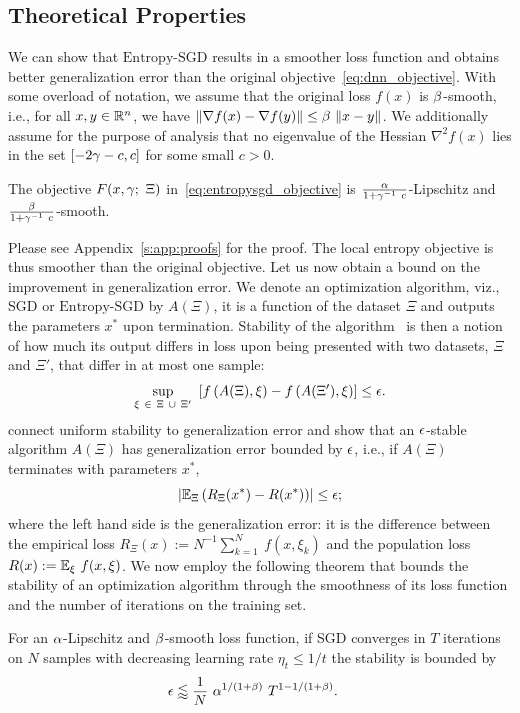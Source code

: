 \documentclass[10pt]{article}
\newcommand{\entropysgd}{\mathrm{Entropy}\textrm{-}\mathrm{SGD}}
\begin{document}
\subsection{Theoretical Properties}
\label{ss:theoretical_properties}

We can show that $\entropysgd$ results in a smoother loss function and obtains better generalization error than the original objective~\eqref{eq:dnn_objective}. With some overload of notation, we assume that the original loss $f(x)$ is $\beta$-smooth, i.e., for all $x,y \in \mathbb{R}^n$, we have $\lVert\nabla f(x) - \nabla f(y)\rVert \leq \beta\ \lVert x-y\rVert$. We additionally assume for the purpose of analysis that no eigenvalue of the Hessian $\nabla^2 f(x)$ lies in the set $[-2 \gamma-c, c]$ for some small $c > 0$.
%
\begin{lemma}
\label{lem:smoothness_reduction}
The objective $F(x, \gamma;\ \Xi)$ in~\eqref{eq:entropysgd_objective} is $\frac{\alpha}{1 + \gamma^{-1}\ c}$-Lipschitz and $\frac{\beta}{1 + \gamma^{-1}\ c}$-smooth.
\end{lemma}
Please see Appendix~\ref{s:app:proofs} for the proof. The local entropy objective is thus smoother than the original objective.
%
Let us now obtain a bound on the improvement in generalization error. We denote an optimization algorithm, viz., SGD or $\entropysgd$ by $A(\Xi)$, it is a function of the dataset $\Xi$ and outputs the parameters $x^*$ upon termination. Stability of the algorithm~\citep{bousquet2002stability} is then a notion of how much its output differs in loss upon being presented with two datasets, $\Xi$ and $\Xi'$, that differ in at most one sample:
$$
    \sup_{\xi\ \in\ \Xi\ \cup\ \Xi'}\ \left[ f \left(A(\Xi), \xi\right) - f \left(A(\Xi'), \xi\right)\right] \leq \epsilon.
$$
\citet{hardt2015train} connect uniform stability to generalization error and show that an $\epsilon$-stable algorithm $A(\Xi)$ has generalization error bounded by $\epsilon$, i.e., if $A(\Xi)$ terminates with parameters $x^*$,
$$
    \left|  \mathbb{E}_{\Xi} \left(R_\Xi(x^*) - R(x^*)\right)  \right| \leq \epsilon;
$$
where the left hand side is the generalization error: it is the difference between the empirical loss $R_\Xi(x) := N^{-1} \sum_{k=1}^N\ f(x, \xi_k)$ and the population loss $R(x) := \mathbb{E}_{\xi}\ f(x, \xi)$.
%
We now employ the following theorem that bounds the stability of an optimization algorithm through the smoothness of its loss function and the number of iterations on the training set.
\begin{theorem}
\label{thm:generalization_bound_nonconvex}
For an $\alpha$-Lipschitz and $\beta$-smooth loss function, if SGD converges in $T$ iterations on $N$ samples with decreasing learning rate $\eta_t \leq 1/t$ the stability is bounded by
\begin{align*}
    \epsilon
    &\lessapprox \frac{1}{N}\ \alpha^{1/(1 + \beta)}\ T^{1 - 1/(1 + \beta)}.
\end{align*}
\end{theorem}
\end{document}
